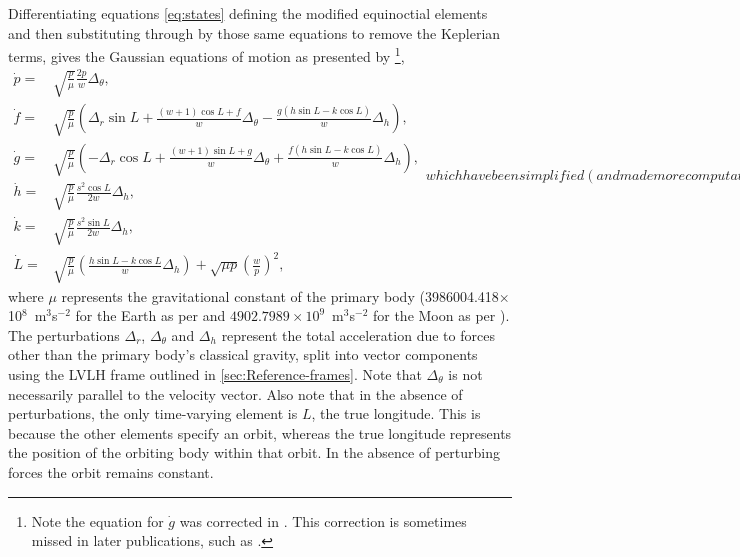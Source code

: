 Differentiating equations \eqref{eq:states} defining the modified equinoctial elements and then substituting through by those same equations to remove the Keplerian terms, gives the Gaussian equations of motion as presented by \textcite{Walker1985,Walker1986,Keppeler_thesis,Erb_thesis,Letterio_thesis,Hintz2008} \footnote{Note the equation for $\dot{g}$ was corrected in \textcite{Walker1986}. This correction is sometimes missed in later publications, such as \textcite{Hintz2008}.},
\begin{subequations}\label{eq:state-updates}
\begin{eqnarray}
\dot{p} = & \sqrt{\frac{p}{\mu}}\frac{2p}{w}\Delta_\theta \label{eq:pdot},\\
\dot{f} = & \sqrt{\frac{p}{\mu}}\left(\Delta_r\sin L+\frac{\left(w+1\right)\cos L+f}{w}\Delta_\theta-\frac{g\left(h\sin L-k\cos L\right)}{w}\Delta_h \right) \label{eq:fdot},\\
\dot{g} = & \sqrt{\frac{p}{\mu}}\left(-\Delta_r\cos L+\frac{\left(w+1\right)\sin L+g}{w}\Delta_\theta+\frac{f\left(h\sin L-k\cos L\right)}{w}\Delta_h \right) \label{eq:gdot},\\
\dot{h} = & \sqrt{\frac{p}{\mu}}\frac{s^{2}\cos L}{2w}\Delta_h \label{eq:hdot},\\
\dot{k} = & \sqrt{\frac{p}{\mu}}\frac{s^{2}\sin L}{2w}\Delta_h \label{eq:kdot},\\
\dot{L} = & \sqrt{\frac{p}{\mu}}\left(\frac{h\sin L-k\cos L}{w}\Delta_h \right)+\sqrt{\mu p}\left(\frac{w}{p}\right)^{2} \label{eq:Ldot},
\end{eqnarray}
which have been simplified (and made more computationally efficient) using the terms
\begin{eqnarray}
w & = & 1+f\cos L+g\sin L\label{eq:w_helper},\\
s^{2} & = & 1+h^{2}+k^{2}\label{eq:s2_helper},
\end{eqnarray}
\end{subequations}
where $\mu$ represents the gravitational constant of the primary body \linebreak (3986004.418$\times$10$^8$~m$^3$s$^{-2}$ for the Earth as per \cite{WGS84} and  $4902.7989\times10^9$~m$^3$s$^{-2}$ for the Moon as per \cite{Zhang1994}). The perturbations $\Delta_r$, $\Delta_\theta$ and $\Delta_h$ represent the total acceleration due to forces other than the primary body's classical gravity, split into vector components using the LVLH frame outlined in \autoref{sec:Reference-frames}. Note that $\Delta_\theta$ is not necessarily parallel to the velocity vector. Also note that in the absence of perturbations, the only time-varying element is $L$, the true longitude. This is because the other elements specify an orbit, whereas the true longitude represents the position of the orbiting body within that orbit. In the absence of perturbing forces the orbit remains constant.




